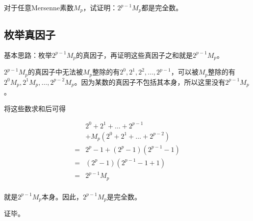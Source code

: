 

对于任意Mersenne素数$M_p$，试证明：$2^{p - 1}M_p$都是完全数。\footnotemark
{}

\subsection{枚举真因子}

基本思路：枚举$2^{p - 1}M_p$的真因子，再证明这些真因子之和就是$2^{p - 1}M_p$。

$2^{p - 1}M_p$的真因子中无法被$M_p$整除的有$2^0, 2^1, 2^2, \dots, 2^{p - 1}$，可以被$M_p$整除的有$2^0M_p, 2^1M_p, \dots, 2^{p - 2}M_p$。因为某数的真因子不包括其本身，所以这里没有$2^{p - 1}M_p$。

将这些数求和后可得

\begin{align*}
  & 2^0 + 2^1 + \dots + 2^{p - 1} \\
  & + M_p(2^0 + 2^1 + \dots + 2^{p - 2}) \\
  ={}& 2^p - 1 + (2^p - 1)(2^{p - 1} - 1) \\
  ={}& (2^p - 1)(2^{p - 1} - 1 + 1) \\
  ={}& 2^{p - 1}M_p \\
\end{align*}

就是$2^{p - 1}M_p$本身。因此，$2^{p - 1}M_p$是完全数。

证毕。

